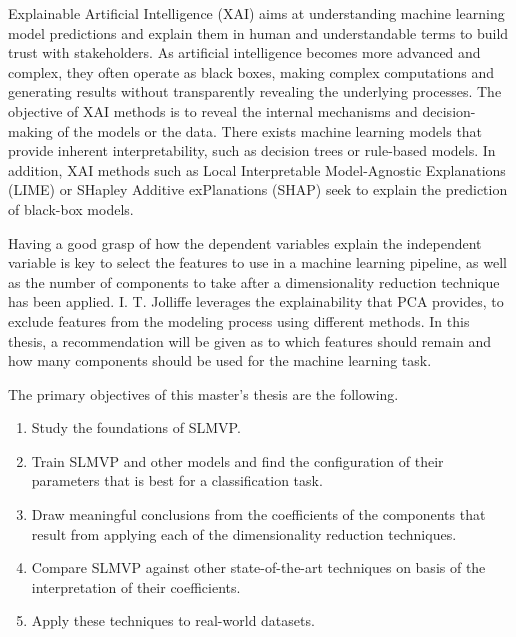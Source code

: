 Explainable Artificial Intelligence \cite{xai} (XAI) aims at understanding machine learning model predictions and explain them in human and understandable terms to build trust with stakeholders. As artificial intelligence becomes more advanced and complex, they often operate as black boxes, making complex computations and generating results without transparently revealing the underlying processes. The objective of XAI methods is to reveal the internal mechanisms and decision-making of the models or the data. There exists machine learning models that provide inherent interpretability, such as decision trees or rule-based models. In addition, XAI methods such as Local Interpretable Model-Agnostic Explanations \cite{lime} (LIME) or SHapley Additive exPlanations \cite{shap} (SHAP) seek to explain the prediction  of black-box models.

Having a good grasp of how the dependent variables explain the independent variable is key to select the features to use in a machine learning pipeline, as well as the number of components to take after a dimensionality reduction technique has been applied. I. T. Jolliffe \cite{b2b4} leverages the explainability that PCA provides, to exclude features from the modeling process using different methods. In this thesis, a recommendation will be given as to which features should remain and how many components should be used for the machine learning task.

The primary objectives of this master's thesis are the following.
\begin{enumerate}
    \item Study the foundations of SLMVP.
    \item Train SLMVP and other models and find the configuration of their parameters that is best for a classification task.
    \item Draw meaningful conclusions from the coefficients of the components that result from applying each of the dimensionality reduction techniques.
    \item Compare SLMVP against other state-of-the-art techniques on basis of the interpretation of their coefficients.
    \item Apply these techniques to real-world datasets.
\end{enumerate}

